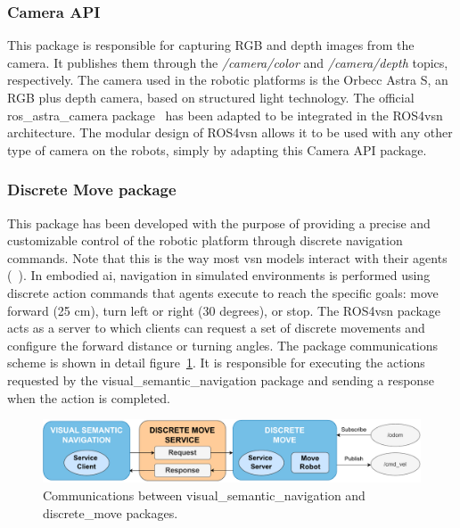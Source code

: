\subsubsection{Camera API}\label{subsubsec:camera-api}

This package is responsible for capturing RGB and depth images from the camera.
It publishes them through the \textit{/camera/color} and \textit{/camera/depth} topics, respectively.
The camera used in the robotic platforms is the Orbecc Astra S, an RGB plus depth camera, based on structured light technology.
The official ros\_astra\_camera package~\cite{orbeccros} has been adapted to be integrated in the ROS4\acrshort{vsn} architecture.
The modular design of ROS4\acrshort{vsn} allows it to be used with any other type of camera on the robots, simply by adapting this Camera API package.

\subsubsection{Discrete Move package}\label{subsubsec:discrete-move-package}

This package has been developed with the purpose of providing a precise and customizable control of the robotic platform through discrete navigation commands.
Note that this is the way most \acrshort{vsn} models interact with their agents (\eg~\cite{ramrakhya2023,chang2020}).
In embodied \acrshort{ai}, navigation in simulated environments is performed using discrete action commands that agents execute to reach the specific goals: move forward (25 cm), turn left or right (30 degrees), or stop.
The ROS4\acrshort{vsn} package acts as a server to which clients can request a set of discrete movements and configure the forward distance or turning angles.
The package communications scheme is shown in detail figure~\ref{fig:discrete_move}.
It is responsible for executing the actions requested by the visual\_semantic\_navigation package and sending a response when the action is completed.

\begin{figure}
    \centering
    \includegraphics[width=\linewidth]{figures/ros4vsn/comunicaciones_service}
    \caption{Communications between visual\_semantic\_navigation and discrete\_move packages.}
    \label{fig:discrete_move}
\end{figure}

